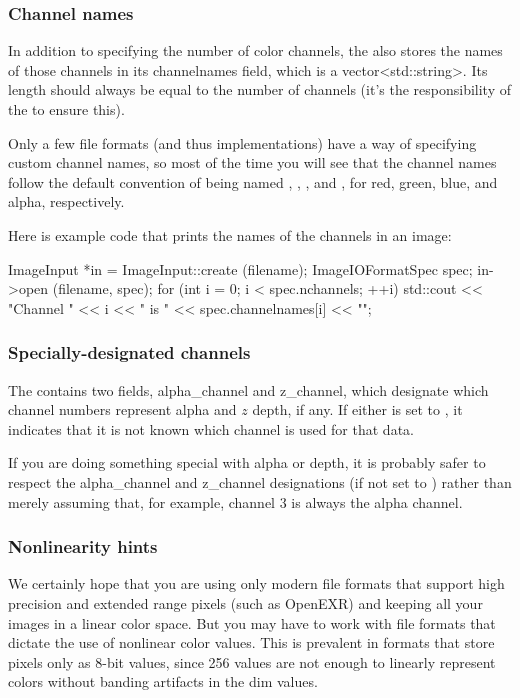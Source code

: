 \subsubsection{Channel names}

In addition to specifying the number of color channels, the
\ImageIOFormatSpec also stores the names of those channels in its {\cf
  channelnames} field, which is a {\cf vector<std::string>}.  Its length
should always be equal to the number of channels (it's the
responsibility of the \ImageInput to ensure this).

Only a few file formats (and thus \ImageInput implementations) have a
way of specifying custom channel names, so most of the time you will see
that the channel names follow the default convention of being named
, , , and , for red, green, blue, and alpha,
respectively.

Here is example code that prints the names of the channels in an image:

\begin{code}
        ImageInput *in = ImageInput::create (filename);
        ImageIOFormatSpec spec;
        in->open (filename, spec);
        for (int i = 0;  i < spec.nchannels;  ++i)
            std::cout << "Channel " << i << " is " 
                      << spec.channelnames[i] << "\n";
\end{code}

\subsubsection{Specially-designated channels}

The \ImageIOFormatSpec contains two fields, {\cf alpha_channel} and {\cf
  z_channel}, which designate which channel numbers represent alpha and
$z$ depth, if any.  If either is set to {}, it indicates that it
is not known which channel is used for that data.

If you are doing something special with alpha or depth, it is probably
safer to respect the {\cf alpha_channel} and {\cf z_channel}
designations (if not set to {}) rather than merely assuming that,
for example, channel 3 is always the alpha channel.

\subsubsection{Nonlinearity hints}

We certainly hope that you are using only modern file formats that
support high precision and extended range pixels (such as OpenEXR) and
keeping all your images in a linear color space.  But you may have to
work with file formats that dictate the use of nonlinear color values.
This is prevalent in formats that store pixels only as 8-bit values,
since 256 values are not enough to linearly represent colors without
banding artifacts in the dim values.

